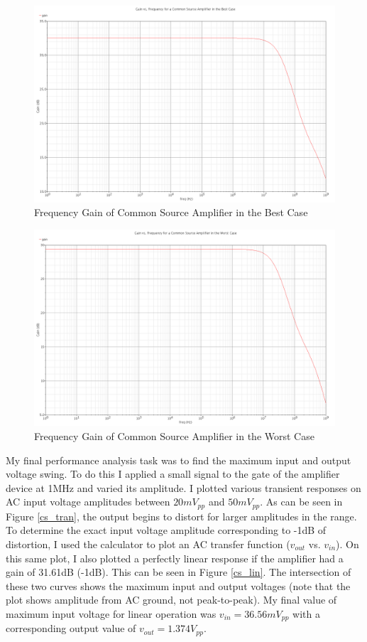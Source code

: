 \documentclass{article}
\begin{document}
\begin{figure}[H]
\centering
\includegraphics[width=5in]{2_cs_gain_ff.png}
\caption{Frequency Gain of Common Source Amplifier in the Best Case}
\label{cs_ff}
\end{figure}

\begin{figure}[H]
\centering
\includegraphics[width=5in]{2_cs_gain_ss.png}
\caption{Frequency Gain of Common Source Amplifier in the Worst Case}
\label{cs_ss}
\end{figure}

My final performance analysis task was to find the maximum input and output voltage swing. To do this I applied a small signal to the gate of the amplifier device at 1MHz and varied its amplitude. I plotted various transient responses on AC input voltage amplitudes between $20mV_{pp}$ and $50mV_{pp}$. As can be seen in Figure \ref{cs_tran}, the output begins to distort for larger amplitudes in the range. To determine the exact input voltage amplitude corresponding to -1dB of distortion, I used the calculator to plot an AC transfer function ($v_{out}$ vs. $v_{in}$). On this same plot, I also plotted a perfectly linear response if the amplifier had a gain of 31.61dB (-1dB). This can be seen in Figure \ref{cs_lin}. The intersection of these two curves shows the maximum input and output voltages (note that the plot shows amplitude from AC ground, not peak-to-peak). My final value of maximum input voltage for linear operation was $v_{in} = 36.56mV_{pp}$ with a corresponding output value of $v_{out} = 1.374V_{pp}$.
\end{document}
